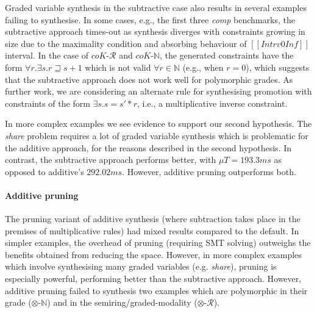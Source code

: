 Graded variable synthesis in the subtractive case also results
in several examples failing to synthesise. In some cases, e.g.,
the first three \textit{comp} benchmarks, the subtractive approach
times-out as synthesis diverges with constraints growing in size
due to the maximality condition and absorbing behaviour of
$[[ Intrv 0 Inf ]]$ interval. In the case of $\textit{coK-$\mathcal{R}$}$
and $\textit{coK-$\mathbb{N}$}$, the generated constraints
have the form $\forall r. \exists s. r \sqsupseteq s + 1 $ which
is not valid $\forall r \in \mathbb{N}$ (e.g., when $r = 0$),
which suggests that the subtractive approach does not work well for
polymorphic grades. As further work, we are
considering an alternate rule for synthesising promotion with
constraints of the form $\exists s . s = s' * r$, i.e.,
a multiplicative inverse constraint.

In more complex examples we see evidence to support
our second hypothesis. The \textit{share} problem requires a lot
of graded variable synthesis which is problematic for the additive
approach, for the reasons described in the second hypothesis. In contrast, the subtractive approach
performs better, with $\mu{T} = 193.3\textit{ms}$ as opposed to additive's
$292.02\textit{ms}$. However, additive pruning outperforms both.


\paragraph{Additive pruning}
The pruning variant of additive synthesis (where subtraction
takes place in the premises of multiplicative rules) had mixed results
compared to the default. In simpler examples, the overhead of pruning
(requiring SMT solving) outweighs
the benefits obtained from reducing the space. However, in more
complex examples which involve synthesising many graded variables (e.g. \textit{share}), pruning is
especially powerful, performing better than the subtractive
approach. However, additive pruning failed to synthesis two
 examples which are polymorphic in their grade
 ($\otimes$-$\mathbb{N}$) and in the semiring/graded-modality ($\otimes$-$\mathcal{R}$).


